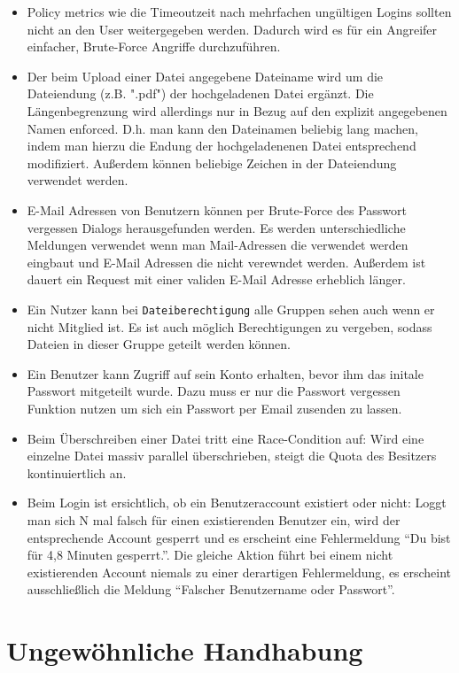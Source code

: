 \documentclass[12pt,DIV14,BCOR10mm,a4paper,parskip=half-,headsepline,headinclude,english,ngerman,bibliography=totocnumbered]{scrreprt}
\begin{document}
\begin{itemize}
  \item Policy metrics wie die Timeoutzeit nach mehrfachen ungültigen Logins sollten nicht an den User weitergegeben werden. Dadurch wird es für ein Angreifer einfacher, Brute-Force Angriffe durchzuführen. \autocite[Loc. 5087]{book:wahh}
  \item Der beim Upload einer Datei angegebene Dateiname wird um die Dateiendung (z.B. ".pdf") der hochgeladenen Datei ergänzt. Die Längenbegrenzung wird allerdings nur in Bezug auf den explizit angegebenen Namen enforced. D.h. man kann den Dateinamen beliebig lang machen, indem man hierzu die Endung der hochgeladenenen Datei entsprechend modifiziert. Außerdem können beliebige Zeichen in der Dateiendung verwendet werden.
  \item E-Mail Adressen von Benutzern können per Brute-Force des Passwort vergessen Dialogs herausgefunden werden. Es werden unterschiedliche Meldungen verwendet wenn man Mail-Adressen die verwendet werden eingbaut und E-Mail Adressen die nicht verewndet werden. Außerdem ist dauert ein Request mit einer validen E-Mail Adresse erheblich länger.
  \item Ein Nutzer kann bei \texttt{Dateiberechtigung} alle Gruppen sehen auch wenn er nicht Mitglied ist. Es ist auch möglich Berechtigungen zu vergeben, sodass Dateien in dieser Gruppe geteilt werden können.
\item Ein Benutzer kann Zugriff auf sein Konto erhalten, bevor ihm das initale Passwort mitgeteilt wurde. Dazu muss er nur die Passwort vergessen Funktion nutzen um sich ein Passwort per Email zusenden zu lassen.
\item Beim Überschreiben einer Datei tritt eine Race-Condition auf: Wird eine einzelne Datei massiv parallel überschrieben, steigt die Quota des Besitzers kontinuiertlich an.
\item Beim Login ist ersichtlich, ob ein Benutzeraccount existiert oder nicht: Loggt man sich N mal falsch für einen existierenden Benutzer ein, wird der entsprechende Account gesperrt und es erscheint eine Fehlermeldung \enquote{Du bist für 4,8 Minuten gesperrt.}. Die gleiche Aktion führt bei einem nicht existierenden Account niemals zu einer derartigen Fehlermeldung, es erscheint ausschließlich die Meldung \enquote{Falscher Benutzername oder Passwort}.
\end{itemize}

\chapter{Ungewöhnliche Handhabung}
\end{document}
